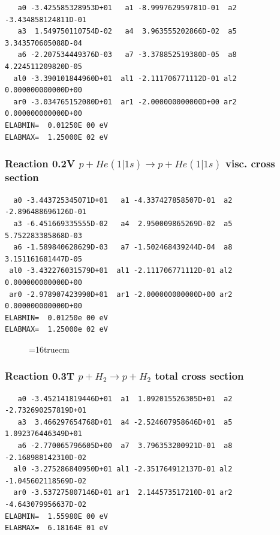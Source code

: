 \documentclass[12pt,dvips]{article}
\begin{document}
\begin{small}\begin{verbatim}
   a0 -3.425585328953D+01   a1 -8.999762959781D-01  a2 -3.434858124811D-01
   a3  1.549750110754D-02   a4  3.963555202866D-02  a5  3.343570605088D-04
   a6 -2.207534449376D-03   a7 -3.378852519380D-05  a8  4.224511209820D-05
  al0 -3.390101844960D+01  al1 -2.111706771112D-01 al2  0.000000000000D+00
  ar0 -3.034765152080D+01  ar1 -2.000000000000D+00 ar2  0.000000000000D+00
ELABMIN=  0.01250E 00 eV
ELABMAX=  1.25000E 02 eV
\end{verbatim}\end{small}


\subsubsection{
Reaction 0.2V   $ p + He(1|1s) \rightarrow p + He (1|1s) $ visc. cross
section }


\begin{small}\begin{verbatim}
  a0 -3.443725345071D+01   a1 -4.337427858507D-01  a2 -2.896488696126D-01
  a3 -6.451669335555D-02   a4  2.950009865269D-02  a5  5.752283385868D-03
  a6 -1.589840628629D-03   a7 -1.502468439244D-04  a8  3.151161681447D-05
 al0 -3.432276031579D+01  al1 -2.111706771112D-01 al2  0.000000000000D+00
 ar0 -2.978907423990D+01  ar1 -2.000000000000D+00 ar2  0.000000000000D+00
ELABMIN=  0.01250e 00 eV
ELABMAX=  1.25000e 02 eV
\end{verbatim}\end{small}


\begin{figure} \label{0.2}
\epsfxsize=16truecm
\end{figure}
\newpage

\subsubsection{
Reaction 0.3T    $p + H_2 \rightarrow p + H_2 $  total cross section
}


\begin{small}\begin{verbatim}
   a0 -3.452141819446D+01  a1  1.092015526305D+01  a2 -2.732690257819D+01
   a3  3.466297654768D+01  a4 -2.524607958646D+01  a5  1.092376446349D+01
   a6 -2.770065796605D+00  a7  3.796353200921D-01  a8 -2.168988142310D-02
  al0 -3.275286840950D+01 al1 -2.351764912137D-01 al2 -1.045602118569D-02
  ar0 -3.537275807146D+01 ar1  2.144573517210D-01 ar2 -4.643079956637D-02
ELABMIN=  1.55980E 00 eV
ELABMAX=  6.18164E 01 eV
\end{verbatim}\end{small}
\end{document}

